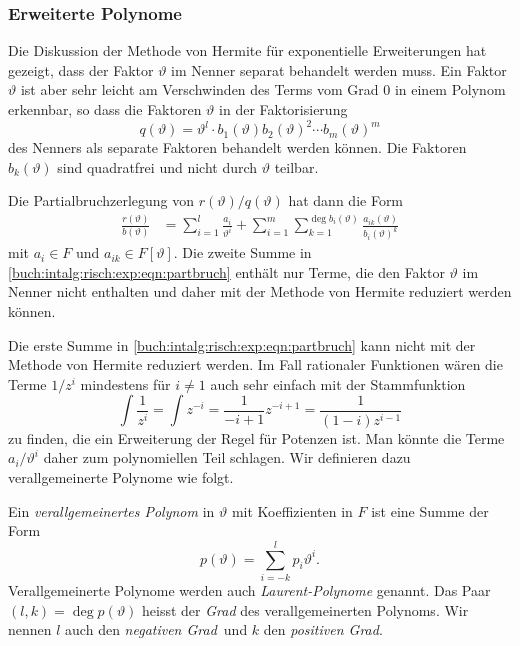 %
%
\subsubsection{Erweiterte Polynome}
Die Diskussion der Methode von Hermite für exponentielle Erweiterungen
hat gezeigt, dass der Faktor $\vartheta$ im Nenner separat behandelt
werden muss.
Ein Faktor $\vartheta$ ist aber sehr leicht am Verschwinden des
Terms vom Grad 0 in einem Polynom erkennbar, so dass die Faktoren $\vartheta$
in der Faktorisierung
\[
q(\vartheta)
=
\vartheta^l \cdot b_1(\vartheta) b_2(\vartheta)^2 \cdots b_m(\vartheta)^m
\]
des Nenners als separate Faktoren behandelt werden können.
Die Faktoren $b_k(\vartheta)$ sind quadratfrei und nicht durch $\vartheta$
teilbar.

Die Partialbruchzerlegung von $r(\vartheta)/q(\vartheta)$ hat dann die
Form
\begin{align}
\frac{r(\vartheta)}{b(\vartheta)}
&=
\sum_{i=1}^l \frac{a_i}{\vartheta^i}
+
\sum_{i=1}^m
\sum_{k=1}^{\deg b_i(\vartheta)}
\frac{a_{ik}(\vartheta)}{b_i(\vartheta)^k}
\label{buch:intalg:risch:exp:eqn:partbruch}
\end{align}
mit $a_i\in F$ und $a_{ik}\in F[\vartheta]$.
Die zweite Summe in \eqref{buch:intalg:risch:exp:eqn:partbruch}
enthält nur Terme, die den Faktor $\vartheta$ im 
Nenner nicht enthalten und daher mit der Methode von Hermite
reduziert werden können.

Die erste Summe in \eqref{buch:intalg:risch:exp:eqn:partbruch}
kann nicht mit der Methode von Hermite reduziert werden.
Im Fall rationaler Funktionen wären die Terme $1/z^i$ mindestens
für $i\ne 1$ auch sehr einfach mit der Stammfunktion
\[
\int \frac{1}{z^i}
=
\int z^{-i}
=
\frac{1}{-i+1}
z^{-i+1}
=
\frac{1}{(1-i)z^{i-1}}
\]
zu finden, die ein Erweiterung der Regel für Potenzen ist.
Man könnte die Terme $a_i/\vartheta^i$ daher zum polynomiellen
Teil schlagen.
Wir definieren dazu verallgemeinerte Polynome wie folgt.

\begin{definition}
Ein \emph{verallgemeinertes Polynom} in $\vartheta$ mit Koeffizienten
%
%
in $F$ ist eine Summe der Form
\[
p(\vartheta)
=
\sum_{i=-k}^l p_i\vartheta^i.
\]
Verallgemeinerte Polynome werden auch \emph{Laurent-Polynome} genannt.
%
Das Paar $(l,k)=\deg p(\vartheta)$ heisst der \emph{Grad} des verallgemeinerten
Polynoms.
Wir nennen $l$ auch den \emph{negativen Grad} und $k$ den
\emph{positiven Grad}.
%
%
%
%
\end{definition}

